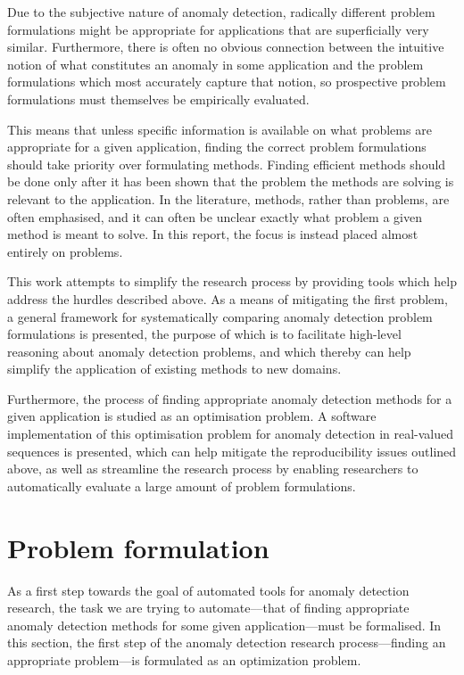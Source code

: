Due to the subjective nature of anomaly detection, radically different problem formulations might be appropriate for applications that are superficially very similar. Furthermore, there is often no obvious connection between the intuitive notion of what constitutes an anomaly in some application and the problem formulations which most accurately capture that notion, so prospective problem formulations must themselves be empirically evaluated.

This means that unless specific information is available on what problems are appropriate for a given application, finding the correct problem formulations should take priority over formulating methods. Finding efficient methods should be done only after it has been shown that the problem the methods are solving is relevant to the application. In the literature, methods, rather than problems, are often emphasised, and it can often be unclear exactly what problem a given method is meant to solve. In this report, the focus is instead placed almost entirely on problems.

This work attempts to simplify the research process by providing tools which help address the hurdles described above. As a means of mitigating the first problem, a general framework for systematically comparing anomaly detection problem formulations is presented, the purpose of which is to facilitate high-level reasoning about anomaly detection problems, and which thereby can help simplify the application of existing methods to new domains.

Furthermore, the process of finding appropriate anomaly detection methods for a given application is studied as an optimisation problem. A software implementation of this optimisation problem for anomaly detection in real-valued sequences is presented, which can help mitigate the reproducibility issues outlined above, as well as streamline the research process by enabling researchers to automatically evaluate a large amount of problem formulations.

\section{Problem formulation}
\label{sect:problem_formulation}
As a first step towards the goal of automated tools for anomaly detection research, the task we are trying to automate–--that of finding appropriate anomaly detection methods for some given application---must be formalised. In this section, the first step of the anomaly detection research process---finding an appropriate problem---is formulated as an optimization problem.


